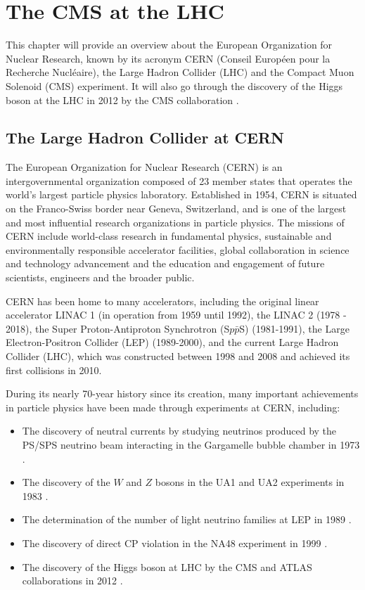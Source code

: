 \chapter[The CMS at the LHC]{The CMS at the LHC}

This chapter will provide an overview about the European Organization for Nuclear Research, known by its acronym CERN (Conseil Européen pour la Recherche Nucléaire), the Large Hadron Collider (LHC) and the Compact Muon Solenoid (CMS) experiment. It will also go through the discovery of the Higgs boson at the LHC in 2012 by the CMS collaboration \cite{CMS:2012qbp}.

\section{The Large Hadron Collider at CERN}

The European Organization for Nuclear Research (CERN) is an intergovernmental organization composed of 23 member states that operates the world's largest particle physics laboratory. Established in 1954, CERN is situated on the Franco-Swiss border near Geneva, Switzerland, and is one of the largest and most influential research organizations in particle physics. The missions of CERN include world-class research in fundamental physics, sustainable and environmentally responsible accelerator facilities, global collaboration in science and technology advancement and the education and engagement of future scientists, engineers and the broader public.

CERN has been home to many accelerators, including the original linear accelerator \linebreak LINAC 1 (in operation from 1959 until 1992), the LINAC 2 (1978 - 2018), the Super Proton-Antiproton Synchrotron (S$p\bar{p}$S) (1981-1991), the Large Electron-Positron Collider (LEP) (1989-2000), and the current Large Hadron Collider (LHC), which was constructed between 1998 and 2008 and achieved its first collisions in 2010.

During its nearly 70-year history since its creation, many important achievements in particle physics have been made through experiments at CERN, including:
\begin{itemize}
    \setlength\itemsep{0em}
    \item The discovery of neutral currents by studying neutrinos produced by the PS/SPS neutrino beam interacting in the Gargamelle bubble chamber in 1973 \cite{GargamelleNeutrino:1973jyy}.
    \item The discovery of the $W$ and $Z$ bosons in the UA1 and UA2 experiments in 1983 \cite{UA1:1983crd, UA2:1983tsx}.
    \item The determination of the number of light neutrino families at LEP in 1989 \cite{ALEPH:1989kcj}.
    \item The discovery of direct CP violation in the NA48 experiment in 1999 \cite{NA48:1999szy}.
    \item The discovery of the Higgs boson at LHC by the CMS and ATLAS collaborations in 2012 \cite{CMS:2012qbp,ATLAS:2012yve}.
\end{itemize}

